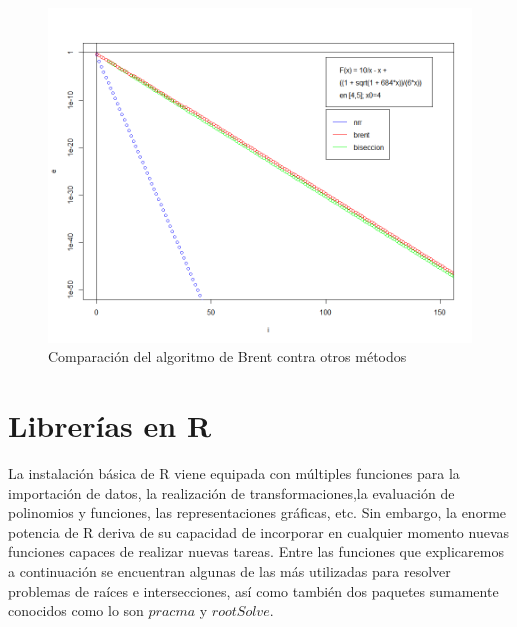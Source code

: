 \documentclass[a4paper,12pt]{article}
\begin{document}
\vspace{-1em}
\begin{figure}[ht!]
\centering
\includegraphics[scale=0.6]{img/nrr_vs_metodos.png}
\vspace{-1em}
\caption{Comparación del algoritmo de Brent contra otros métodos}
\label{fig:nrr_vs_metodos}
\end{figure}

\newpage


\section{Librerías en R}

La instalación básica de R viene equipada con múltiples funciones para la importación de datos, la realización de transformaciones,la evaluación de polinomios y funciones, las representaciones gráficas, etc. Sin embargo, la enorme potencia de R deriva de su capacidad de incorporar en cualquier momento nuevas funciones capaces de realizar nuevas tareas.
Entre las funciones que explicaremos a continuación se encuentran algunas de las más utilizadas para resolver problemas de raíces e intersecciones, así como también dos paquetes sumamente conocidos como lo son $pracma$ y $rootSolve$.
\par

\end{document}
